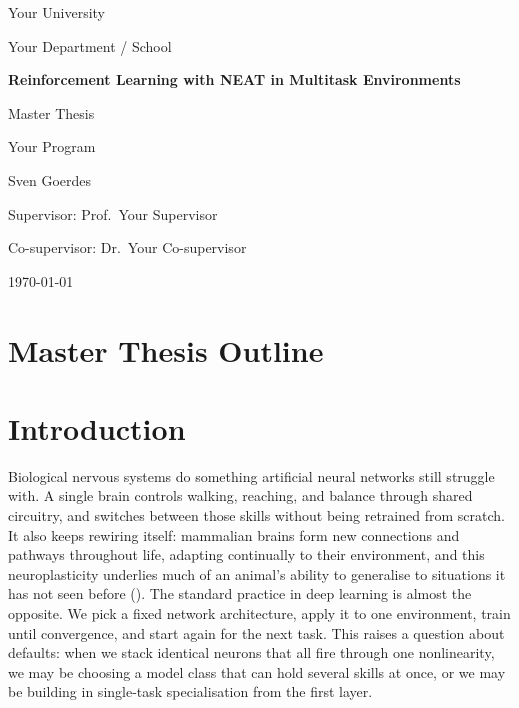 \documentclass[12pt]{article}
\newcommand{\ThesisTitle}{Reinforcement Learning with NEAT in Multitask Environments}
\newcommand{\ThesisAuthor}{Sven Goerdes}
\newcommand{\ThesisDegree}{Master Thesis}
\newcommand{\ThesisProgram}{Your Program}
\newcommand{\ThesisUniversity}{Your University}
\newcommand{\ThesisDepartment}{Your Department / School}
\newcommand{\ThesisSupervisor}{Supervisor: Prof.\ Your Supervisor}
\newcommand{\ThesisCoSupervisor}{Co-supervisor: Dr.\ Your Co-supervisor}
\newcommand{\ThesisDate}{\today}
\begin{document}
\begin{titlepage}
  \thispagestyle{empty}
  \centering

  {\Large \ThesisUniversity\par}
  {\large \ThesisDepartment\par}
  \vfill

  {\LARGE\bfseries \ThesisTitle\par}
  \vspace{1.5cm}

  {\large \ThesisDegree\par}
  {\large \ThesisProgram\par}
  \vfill

  {\large \ThesisAuthor\par}
  \vspace{0.5cm}
  {\large \ThesisSupervisor\par}
  {\large \ThesisCoSupervisor\par}
  \vfill

  {\large \ThesisDate\par}
\end{titlepage}

\section*{Master Thesis Outline}

\tableofcontents

\bigskip

\newpage

\newpage

\section{Introduction}
\label{sec:introduction}

Biological nervous systems do something artificial neural networks still struggle with.
A single brain controls walking, reaching, and balance through shared circuitry, and switches between those skills without being retrained from scratch.
It also keeps rewiring itself: mammalian brains form new connections and pathways throughout life, adapting continually to their environment, and this neuroplasticity underlies much of an animal's ability to generalise to situations it has not seen before (\cite{pascual-leone_plastic_2005}).
The standard practice in deep learning is almost the opposite.
We pick a fixed network architecture, apply it to one environment, train until convergence, and start again for the next task.
This raises a question about defaults: when we stack identical neurons that all fire through one nonlinearity, we may be choosing a model class that can hold several skills at once, or we may be building in single-task specialisation from the first layer.
\end{document}
